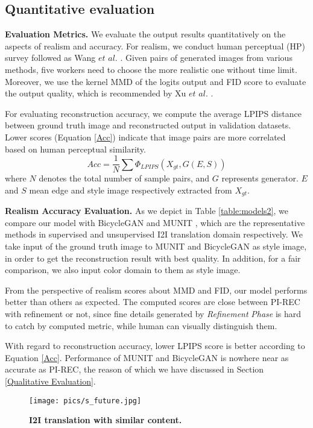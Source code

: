 \documentclass[10pt,twocolumn,letterpaper]{article} \usepackage{amsfonts,amssymb}
\begin{document}
\subsection{Quantitative evaluation} \label{Quantitative evaluation}
{\bf Evaluation Metrics.}
We evaluate the output results quantitatively on the aspects of realism and accuracy. For realism, we conduct human perceptual (HP) survey follow\-ed as Wang $et$ $al$. \cite{wang2018high}. Given pairs of generated images from various methods, five workers need to choose the more realistic one without time limit. Moreover, we use the kernel MMD \cite{gretton2007kernel} of the logits output and FID score \cite{heusel2017gans} to evaluate the output quality, which is recommended by Xu $et$ $al$. \cite{xu2018empirical}.

For evaluating reconstruction accuracy, we compute the average LPIPS distance \cite{zhang2018unreasonable} between ground truth image and reconstructed output in validation datasets. Lower scores (Equation \ref{Acc}) indicate that image pairs are more correlated based on human perceptual similarity.
\begin{equation}
\label{Acc}
Acc = \frac{1}{N} \sum \Phi_{LPIPS}(X_{gt}, G(E, S))
\end{equation}
where $N$ denotes the total number of sample pairs, and $G$ represents generator. $E$ and $S$ mean edge and style image respectively extracted from $X_{gt}$.

{\bf Realism  Accuracy Evaluation.}
As we depict in Table \ref{table:models2}, we compare our model with BicycleGAN \cite{zhu2017toward} and MUNIT \cite{huang2018multimodal}, which are the representative methods in supervised and unsupervised I2I translation domain respectively. We take input of the ground truth image to MUNIT and BicycleGAN as style image, in order to get the reconstruction result with best quality. In addition, for a fair comparison, we also input color domain to them as style image.

From the perspective of realism scores about MMD and FID, our model performs better than others as expected. The computed scores are close between PI-REC with refinement or not, since fine details generated by \emph{Refinement} \emph{Phase} is hard to catch by computed metric, while human can visually distinguish them.

With regard to reconstruction accuracy, lower LPIPS score is better according to Equation \ref{Acc}. Performance of MUNIT and BicycleGAN is nowhere near as accurate as PI-REC, the reason of which we have discussed in Section \ref{Qualitative Evaluation}.
\begin{figure}[h]
\centering



\texttt{[image: pics/s\_future.jpg]}

\caption{\textbf{I2I translation with similar content.}}
\label{future}
\end{figure}
\end{document}
